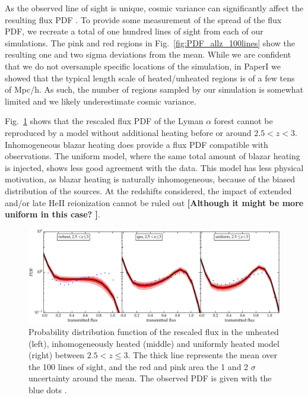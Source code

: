\documentclass[numberedappendix]{emulateapj}
\newcommand\ALc[1]{{\color{red} \bf #1}} %
\begin{document}
As the observed line of sight is unique, cosmic variance can significantly affect the resulting flux PDF \citep{2013MNRAS.428..540R,2017MNRAS.466.2690R}. To provide some measurement of the spread of the flux PDF, we recreate a total of one hundred  lines of sight from each of our simulations. The pink and red regions in Fig.~\ref{fig:PDF_allz_100lines} show the resulting one and two sigma deviations from the mean. While we are confident that we do not oversample specific locations of the simulation, in PaperI we showed that the typical length scale  of heated/unheated regions is of a few tens of Mpc/h. As such, the number of regions sampled by our simulation is somewhat limited and we likely underestimate cosmic variance. 

Fig.~\ref{fig:PDF_A} shows that the rescaled flux PDF of the Lyman $\alpha$ forest cannot be reproduced by a model without additional heating before or around $2.5<z<3$. Inhomogeneous blazar heating does provide a flux PDF compatible with observations. The uniform model, where the same total amount of blazar heating is injected, shows less good agreement with the data. This model has less physical motivation, as blazar heating is naturally inhomogeneous, because of the biased distribution of the sources.  At the redshifts considered, the impact of extended and/or late HeII reionization cannot be ruled out \ALc{[Although it might be more uniform in this case? ]}. 







\begin{figure}[h]
\centering
\includegraphics[width = .9\textwidth ]{PDF_allz_100lines}
\caption{Probability distribution function of the rescaled flux in the unheated (left), inhomogeneously heated (middle) and uniformly heated model (right) between $2.5 <z\leq 3$. The thick line represents the mean over the 100 lines of sight, and the red and pink area the 1 and 2 $\sigma$ uncertainty around the mean. The observed PDF is given with the blue dots \citet{2017MNRAS.466.2690R}. }
\label{fig:PDF_A}
\end{figure}
\end{document}
